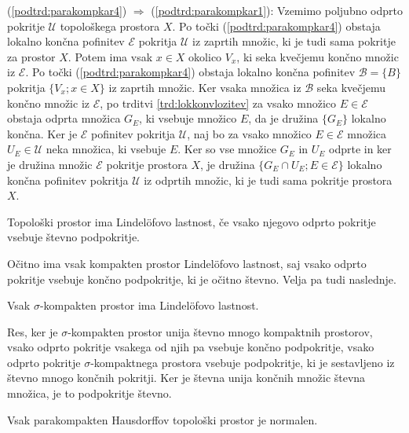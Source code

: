 \documentclass[mat1]{fmfdelo}
\newcommand{\Ucurl}{\mathcal{U}}
\begin{document}
\begin{dokaz}
(\ref{podtrd:parakompkar4}) $\Rightarrow$ (\ref{podtrd:parakompkar1}):
Vzemimo poljubno odprto pokritje $\Ucurl$ topološkega prostora $X$. Po točki (\ref{podtrd:parakompkar4}) obstaja lokalno končna pofinitev $\mathcal{E}$ pokritja $\Ucurl$ iz zaprtih množic, ki je tudi sama pokritje za prostor $X$. Potem ima vsak $x \in X$ okolico $V_x$, ki seka kvečjemu končno množic iz $\mathcal{E}$. Po točki (\ref{podtrd:parakompkar4}) obstaja lokalno končna pofinitev $\mathcal{B} = \lbrace B \rbrace$ pokritja $\lbrace V_x ; x \in X \rbrace$ iz zaprtih množic. Ker vsaka množica iz $\mathcal{B}$ seka kvečjemu končno množic iz $\mathcal{E}$, po trditvi \ref{trd:lokkonvlozitev} za vsako množico $E \in \mathcal{E}$ obstaja odprta množica $G_E$, ki vsebuje množico $E$, da je družina $\lbrace G_E \rbrace$ lokalno končna. Ker je $\mathcal{E}$ pofinitev pokritja $\Ucurl$, naj bo za vsako množico $E \in \mathcal{E}$ množica $U_E \in \Ucurl$ neka množica, ki vsebuje $E$. Ker so vse množice $G_E$ in $U_E$ odprte in ker je družina množic $\mathcal{E}$ pokritje prostora $X$, je družina $\lbrace G_E \cap U_E ; E \in \mathcal{E} \rbrace$ lokalno končna pofinitev pokritja $\Ucurl$ iz odprtih množic, ki je tudi sama pokritje prostora $X$.
\end{dokaz}

\begin{definicija}
Topološki prostor ima Lindel\"ofovo lastnost, če vsako njegovo odprto pokritje vsebuje števno podpokritje.
\end{definicija}

Očitno ima vsak kompakten prostor Lindel\"ofovo lastnost, saj vsako odprto pokritje vsebuje končno podpokritje, ki je očitno števno. Velja pa tudi naslednje.
\begin{trditev}
Vsak $\sigma$-kompakten prostor ima Lindel\"ofovo lastnost.
\end{trditev}
\begin{dokaz}
Res, ker je $\sigma$-kompakten prostor unija števno mnogo kompaktnih prostorov, vsako odprto pokritje vsakega od njih pa vsebuje končno podpokritje, vsako odprto pokritje $\sigma$-kompaktnega prostora vsebuje pod\-pok\-rit\-je, ki je sestavljeno iz števno mnogo končnih pokritji. Ker je števna unija končnih množic števna množica, je to podpokritje števno.
\end{dokaz}

\begin{trditev}\label{trd:parkompnorm} %
Vsak parakompakten Hausdorffov topološki prostor je normalen.
\end{trditev}
\end{document}
